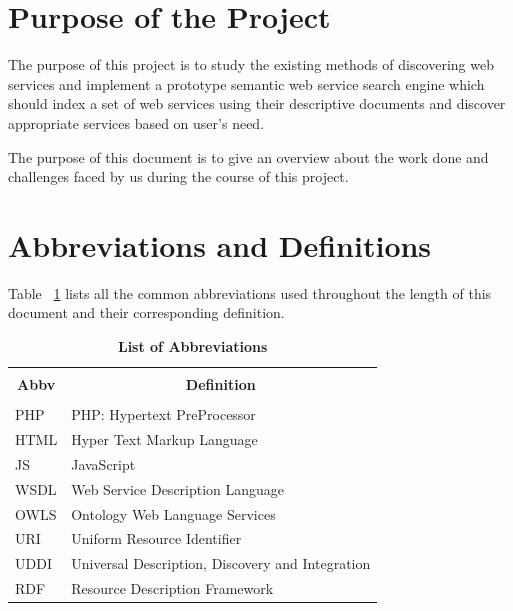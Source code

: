 \documentclass[12pt, twoside]{book}
\begin{document}
\section{Purpose of the Project}
The purpose of this project is to study the existing methods of discovering web services and implement a prototype semantic web service search engine which should index a set of web services using their descriptive documents and discover appropriate services based on user's need. \\ \par
The purpose of this document is to give an overview about the work done and challenges faced by us during the course of this project.

\section{Abbreviations and Definitions}
Table ~\ref{tab: abbv} lists all the common abbreviations used throughout the length of this document and their corresponding definition.
\begin{table}[h]
	\begin{center}
		\caption{\textbf{List of Abbreviations}}
		\begin{tabular}{| p{} | p{} |}
			\hline
			\multicolumn{1}{|c|}{} & \multicolumn{1}{c|}{} \\
			\multicolumn{1}{|c|}{\textbf{Abbv}} & \multicolumn{1}{c|}{\textbf{Definition}} \\
			\multicolumn{1}{|c|}{} & \multicolumn{1}{c|}{} \\
			\hline
			PHP & PHP: Hypertext PreProcessor \\ \hline
			HTML & Hyper Text Markup Language \\ \hline
			JS & JavaScript \\ \hline
			WSDL & Web Service Description Language \\ \hline
			OWLS & Ontology Web Language Services \\ \hline
			URI & Uniform Resource Identifier \\ \hline
			UDDI & Universal Description, Discovery and Integration \\ \hline
			RDF & Resource Description Framework \\ \hline
		\end{tabular}
	\end{center}
	\label{tab: abbv}
\end{table}
\end{document}
